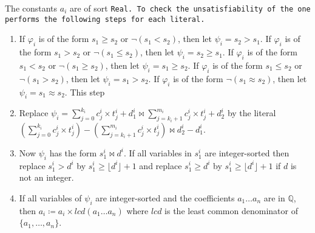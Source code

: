The constants $a_i$ are of sort \tt{Real}. To check the unsatisfiability of the  one performs the following steps for each literal. 

\begin{enumerate}
    \item If $\varphi_i$ is of the form $s_1 \geq s_2$ or $\neg (s_1 < s_2)$, then let $\psi_i = s_2 > s_1$.
    If $\varphi_i$ is of the form $s_1 > s_2$ or $\neg (s_1 \leq s_2)$, then let $\psi_i = s_2 \geq s_1$.
    If $\varphi_i$ is of the form $s_1 < s_2$ or $\neg (s_1 \geq s_2)$, then let $\psi_i = s_1 \geq s_2$.
    If $\varphi_i$ is of the form $s_1 \leq s_2$ or $\neg (s_1 > s_2)$, then let $\psi_i = s_1 > s_2$.
    If $\varphi_i$ is of the form $\neg (s_1 \approx s_2)$, then let $\psi_i = s_1 \approx s_2$.
    This step 


    \item Replace $\psi_i = \sum_{j=0}^{k_i}c_j^i\times{}t_j^i + d_1^i \bowtie \sum_{j=k_i+1}^{m_i} c_j^i\times{}t_j^i + d_2^i$ by the literal $\left(\sum_{j=0}^{k_i}c_j^i\times{}t_j^i\right) - \left(\sum_{j=k_i+1}^{m_i} c_j^i\times{}t_j^i\right)
    \bowtie d_2^i - d_1^i$.
  
    \item \label{la_generic:str}Now $\psi_i$ has the form $s_1^i \bowtie d^i$. If all
    variables in $s_1^i$ are integer-sorted then replace $s_1^i > d^i$ by $s_1^i \geq \lfloor d^i \rfloor + 1$
    and replace $s_1^i \geq d^i$ by $s_1^i \geq \lfloor d^i \rfloor + 1$ if $d$ is not an integer.

    \item If all variables of $\psi_i$ are integer-sorted and the coefficients $a_1 \dots a_n$ are in $\mathbb{Q}$,
    then $a_i \coloneq a_i \times \mathit{lcd}(a_1 \dots a_n)$ where $\mathit{lcd}$ is the least common denominator of $\{a_1, \dots, a_n\}$.
    

\end{enumerate}
